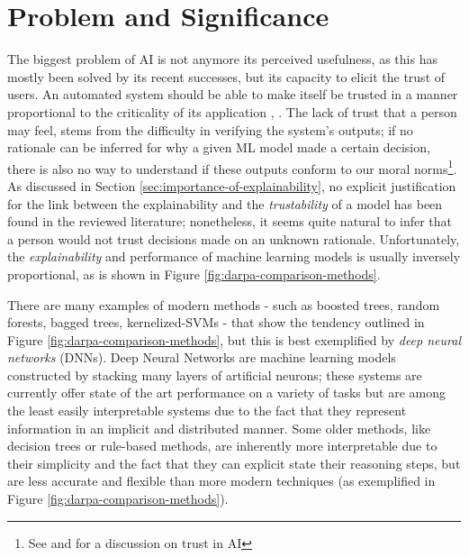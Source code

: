 \section{Problem and Significance}
The biggest problem of AI is not anymore its perceived usefulness, as this has mostly been solved by its recent successes, but its capacity to elicit the trust of users.
An automated system should be able to make itself be trusted in a manner proportional to the criticality of its application \citep{gilpin2018explaining}, \citep{abdul2018trends}.
The lack of trust that a person may feel, stems from the difficulty in verifying the system's outputs; if no rationale can be inferred for why a given ML model made a certain decision, there is also no way to understand if these outputs conform to our moral norms\footnote{See \citet{gilpin2018explaining} and \citet{abdul2018trends} for a discussion on trust in AI}.
As discussed in Section \ref{sec:importance-of-explainability}, no explicit justification for the link between the explainability and the \textit{trustability} of a model has been found in the reviewed literature; nonetheless, it seems quite natural to infer that a person would not trust decisions made on an unknown rationale. 
Unfortunately, the \textit{explainability} and performance of machine learning models is usually inversely proportional, as is shown in Figure \ref{fig:darpa-comparison-methods}.

There are many examples of modern methods - such as boosted trees, random forests, bagged trees, kernelized-SVMs - that show the tendency outlined in Figure \ref{fig:darpa-comparison-methods}, but this is best exemplified by \textit{deep neural networks} (DNNs). 
Deep Neural Networks are machine learning models constructed by stacking many layers of artificial neurons; these systems are currently offer state of the art performance on a variety of tasks but are among the least easily interpretable systems due to the fact that they represent information in an implicit and distributed manner.  
Some older methods, like decision trees or rule-based methods, are inherently more interpretable due to their simplicity and the fact that they can explicit state their reasoning steps, but are less accurate and flexible than more modern techniques \citep{Biran2017} (as exemplified in Figure \ref{fig:darpa-comparison-methods}).

